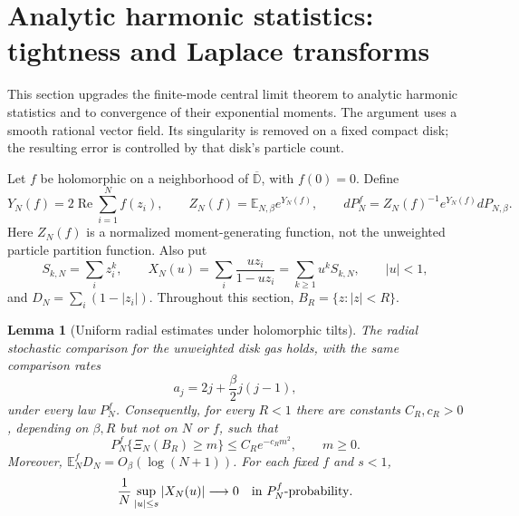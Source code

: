 \documentclass[11pt,a4paper]{article}
\numberwithin{equation}{section}
\newtheorem{lemma}[theorem]{Lemma}
\theoremstyle{definition}
\theoremstyle{remark}
\newcommand{\D}{\mathbb D}
\begin{document}
\section{Analytic harmonic statistics: tightness and Laplace transforms}
\label{sec:analytic-harmonic-statistics}

This section upgrades the finite-mode central limit theorem to analytic
harmonic statistics and to convergence of their exponential moments.
The argument uses a smooth rational vector field. Its singularity is
removed on a fixed compact disk; the resulting error is controlled by
that disk's particle count.

Let $f$ be holomorphic on a neighborhood of $\overline{\D}$, with
$f(0)=0$. Define
\[
 Y_N(f)=2\operatorname{Re}\sum_{i=1}^N f(z_i),\qquad
 Z_N(f)=\mathbb E_{N,\beta}e^{Y_N(f)},\qquad
 dP_N^f=Z_N(f)^{-1}e^{Y_N(f)}dP_{N,\beta}.
\]
Here $Z_N(f)$ is a normalized moment-generating function, not the
unweighted particle partition function. Also put
\[
 S_{k,N}=\sum_i z_i^k,\qquad
 X_N(u)=\sum_i\frac{u z_i}{1-u z_i}
       =\sum_{k\geq1}u^kS_{k,N},\qquad |u|<1,
\]
and $D_N=\sum_i(1-|z_i|)$. Throughout this section,
$B_R=\{z:|z|<R\}$.

\begin{lemma}[Uniform radial estimates under holomorphic tilts]
\label{lem:analytic-tilt-radial}
The radial stochastic comparison for the unweighted disk gas holds,
with the same comparison rates
\[
 a_j=2j+\frac\beta2j(j-1),
\]
under every law $P_N^f$. Consequently, for every $R<1$ there are
constants $C_R,c_R>0$, depending on $\beta,R$ but not on $N$ or $f$,
such that
\begin{equation}\label{eq:analytic-tilt-count}
 P_N^f\{\Xi_N(B_R)\geq m\}\leq C_R e^{-c_Rm^2},\qquad m\geq0.
\end{equation}
Moreover, $\mathbb E_N^fD_N=O_\beta(\log(N+1))$. For each fixed $f$
and $s<1$,
\begin{equation}\label{eq:analytic-tilt-macro}
 \frac1N\sup_{|u|\leq s}|X_N(u)|\longrightarrow0
 \quad\hbox{in }P_N^f\hbox{-probability}.
\end{equation}
\end{lemma}
\end{document}
